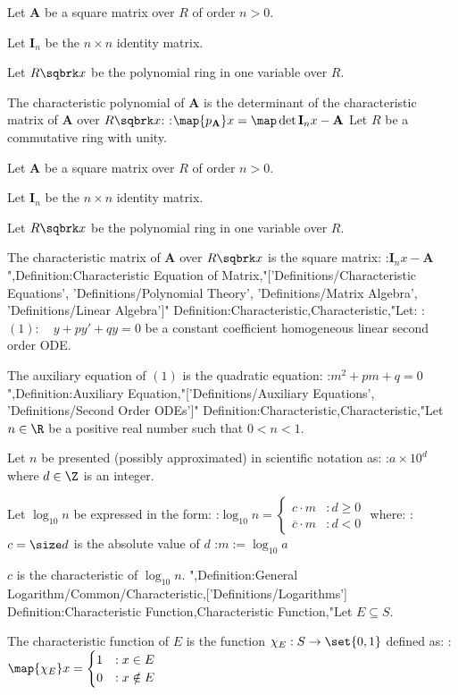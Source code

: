 Let $\mathbf A$ be a square matrix over $R$ of order $n > 0$.

Let $\mathbf I_n$ be the $n \times n$ identity matrix.

Let $R \sqbrk x$ be the polynomial ring in one variable over $R$.


The characteristic polynomial of $\mathbf A$ is the determinant of the characteristic matrix of $\mathbf A$ over $R \sqbrk x$:
:$\map {p_{\mathbf A} } x = \map \det {\mathbf I_n x - \mathbf A}$
Let $R$ be a commutative ring with unity.

Let $\mathbf A$ be a square matrix over $R$ of order $n > 0$.

Let $\mathbf I_n$ be the $n \times n$ identity matrix.

Let $R \sqbrk x$ be the polynomial ring in one variable over $R$.


The characteristic matrix of $\mathbf A$ over $R \sqbrk x$ is the square matrix:
:$\mathbf I_n x - \mathbf A$
",Definition:Characteristic Equation of Matrix,"['Definitions/Characteristic Equations', 'Definitions/Polynomial Theory', 'Definitions/Matrix Algebra', 'Definitions/Linear Algebra']"
Definition:Characteristic,Characteristic,"Let:
:$(1): \quad y + p y' + q y = 0$
be a constant coefficient homogeneous linear second order ODE.


The auxiliary equation of $(1)$ is the quadratic equation:
:$m^2 + p m + q = 0$",Definition:Auxiliary Equation,"['Definitions/Auxiliary Equations', 'Definitions/Second Order ODEs']"
Definition:Characteristic,Characteristic,"Let $n \in \R$ be a positive real number such that $0 < n < 1$.

Let $n$ be presented (possibly approximated) in scientific notation as:
:$a \times 10^d$
where $d \in \Z$ is an integer.


Let $\log_{10} n$ be expressed in the form:
:$\log_{10} n = \begin {cases} c \cdotp m & : d \ge 0 \\ \overline c \cdotp m & : d < 0 \end {cases}$
where:
:$c = \size d$ is the absolute value of $d$
:$m := \log_{10} a$


$c$ is the characteristic of $\log_{10} n$.
",Definition:General Logarithm/Common/Characteristic,['Definitions/Logarithms']
Definition:Characteristic Function,Characteristic Function,"Let $E \subseteq S$.

The characteristic function of $E$ is the function $\chi_E: S \to \set {0, 1}$ defined as:
:$\map {\chi_E} x = \begin {cases} 1 & : x \in E  \\  0 & : x \notin E \end {cases}$

